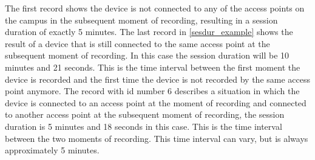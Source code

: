 The first record shows the device is not connected to any of the access points on the campus in the subsequent moment of recording, resulting in a session duration of exactly 5 minutes. The last record in \autoref{sesdur_example} shows the result of a device that is still connected to the same access point at the subsequent moment of recording. In this case the session duration will be 10 minutes and 21 seconds. This is the time interval between the first moment the device is recorded and the first time the device is not recorded by the same access point anymore. The record with id number 6 describes a situation in which the device is connected to an access point at the moment of recording and connected to another access point at the subsequent moment of recording, the session duration is 5 minutes and 18 seconds in this case. This is the time interval between the two moments of recording. This time interval can vary, but is always approximately 5 minutes.\\\\
